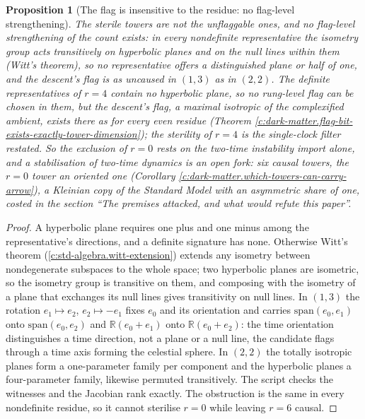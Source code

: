\documentclass[11pt]{article}
\newtheorem{proposition}[theorem]{Proposition}
\theoremstyle{definition}
\theoremstyle{plain}
\providecommand{\R}{}\renewcommand{\R}{\mathbb{R}}
\begin{document}
\begin{proposition}[The flag is insensitive to the residue: no flag-level strengthening]\label{c:dark-matter.flag-insensitive-residue-no-flag-level}
The sterile towers are not the unflaggable ones, and no flag-level strengthening of the count exists: in every nondefinite representative the isometry group acts transitively on hyperbolic planes and on the null lines within them (Witt's theorem), so no representative offers a distinguished plane or half of one, and the descent's flag is as uncaused in $(1,3)$ as in $(2,2)$. The definite representatives of $r = 4$ contain no hyperbolic plane, so no \emph{rung-level} flag can be chosen in them, but the descent's flag, a maximal isotropic of the complexified ambient, exists there as for every even residue (Theorem \ref{c:dark-matter.flag-bit-exists-exactly-tower-dimension}); the sterility of $r = 4$ is the single-clock filter restated. So the exclusion of $r = 0$ rests on the two-time instability import alone, and a stabilisation of two-time dynamics is an open fork: six causal towers, the $r = 0$ tower an \emph{oriented} one (Corollary \ref{c:dark-matter.which-towers-can-carry-arrow}), a Kleinian copy of the Standard Model with an asymmetric share of one, costed in the section ``The premises attacked, and what would refute this paper''.
\end{proposition}
\begin{proof}
A hyperbolic plane requires one plus and one minus among the representative's directions, and a definite signature has none. Otherwise Witt's theorem (\ref{c:std-algebra.witt-extension}) extends any isometry between nondegenerate subspaces to the whole space; two hyperbolic planes are isometric, so the isometry group is transitive on them, and composing with the isometry of a plane that exchanges its null lines gives transitivity on null lines. In $(1,3)$ the rotation $e_{1} \mapsto e_{2}$, $e_{2} \mapsto -e_{1}$ fixes $e_{0}$ and its orientation and carries $\mathrm{span}(e_{0}, e_{1})$ onto $\mathrm{span}(e_{0}, e_{2})$ and $\R(e_{0} + e_{1})$ onto $\R(e_{0} + e_{2})$: the time orientation distinguishes a time direction, not a plane or a null line, the candidate flags through a time axis forming the celestial sphere. In $(2,2)$ the totally isotropic planes form a one-parameter family per component and the hyperbolic planes a four-parameter family, likewise permuted transitively. The script checks the witnesses and the Jacobian rank exactly. The obstruction is the same in every nondefinite residue, so it cannot sterilise $r = 0$ while leaving $r = 6$ causal.

\end{proof}
\end{document}
